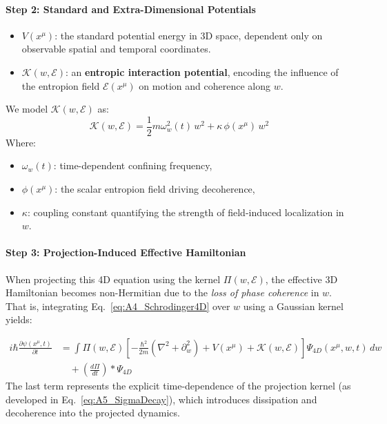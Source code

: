 \documentclass[12pt]{article}
\begin{document}
\paragraph{Step 2: Standard and Extra-Dimensional Potentials}

\begin{itemize}
  \item \(V(x^\mu)\): the standard potential energy in 3D space, dependent only on observable spatial and temporal coordinates.
  \item \(\mathcal{K}(w, \mathcal{E})\): an \textbf{entropic interaction potential}, encoding the influence of the entropion field \(\mathcal{E}(x^\mu)\) on motion and coherence along \(w\).
\end{itemize}

We model \(\mathcal{K}(w, \mathcal{E})\) as:
\begin{equation}
\mathcal{K}(w, \mathcal{E}) = \frac{1}{2} m \omega_w^2(t)\, w^2 + \kappa\, \phi(x^\mu)\, w^2
\label{eq:A4_Kpotential}
\end{equation}
Where:
\begin{itemize}
  \item \(\omega_w(t)\): time-dependent confining frequency,
  \item \(\phi(x^\mu)\): the scalar entropion field driving decoherence,
  \item \(\kappa\): coupling constant quantifying the strength of field-induced localization in \(w\).
\end{itemize}

\paragraph{Step 3: Projection-Induced Effective Hamiltonian}

When projecting this 4D equation using the kernel \(\Pi(w, \mathcal{E})\), the effective 3D Hamiltonian becomes non-Hermitian due to the \emph{loss of phase coherence} in \(w\). That is, integrating Eq.~\eqref{eq:A4_Schrodinger4D} over \(w\) using a Gaussian kernel yields:

\begin{align}
i\hbar \frac{\partial \psi(x^\mu, t)}{\partial t} &= \int \Pi(w, \mathcal{E}) \left[ -\frac{\hbar^2}{2m}(\nabla^2 + \partial_w^2) + V(x^\mu) + \mathcal{K}(w, \mathcal{E}) \right] \Psi_{4D}(x^\mu, w, t)\, dw \nonumber \\
&\quad + \left( \frac{d\Pi}{dt} \right) \ast \Psi_{4D}
\label{eq:A4_ProjectedEOM}
\end{align}
The last term represents the explicit time-dependence of the projection kernel (as developed in Eq.~\eqref{eq:A5_SigmaDecay}), which introduces dissipation and decoherence into the projected dynamics.
\end{document}
